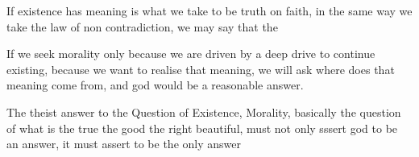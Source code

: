 If existence has meaning is what we take to be truth on faith, in the same way we take the law of non contradiction, we may say that the

If we seek morality only because we are driven by a deep drive to continue existing, because we want to realise that meaning, we will ask where does that meaning come from, and god would be a reasonable answer. 


The theist answer to the Question of Existence, Morality, basically the question of what is the true the good the right beautiful, must not only sssert god to be an answer, it must assert to be the only answer 







